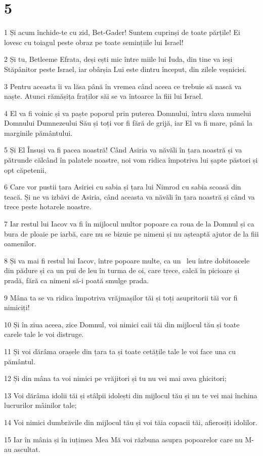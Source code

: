 \chapter{5}

\par 1 Și acum închide-te cu zid, Bet-Gader! Suntem cuprinși de toate părțile! Ei lovesc cu toiagul peste obraz pe toate semințiile lui Israel!
\par 2 Și tu, Betleeme Efrata, deși ești mic între miile lui Iuda, din tine va ieși Stăpânitor peste Israel, iar obârșia Lui este dintru început, din zilele veșniciei.
\par 3 Pentru aceasta îi va lăsa până în vremea când aceea ce trebuie să nască va naște. Atunci rămășița fraților săi se va întoarce la fiii lui Israel.
\par 4 El va fi voinic și va paște poporul prin puterea Domnului, întru slava numelui Domnului Dumnezeului Său și toți vor fi fără de grijă, iar El va fi mare, până la marginile pământului.
\par 5 Și El Însuși va fi pacea noastră! Când Asiria va năvăli în țara noastră și va pătrunde călcând în palatele noastre, noi vom ridica împotriva lui șapte păstori și opt căpetenii,
\par 6 Care vor pustii țara Asiriei cu sabia și țara lui Nimrod cu sabia scoasă din teacă. Și ne va izbăvi de Asiria, când aceasta va năvăli în țara noastră și când va trece peste hotarele noastre.
\par 7 Iar restul lui Iacov va fi în mijlocul multor popoare ca roua de la Domnul și ca bura de ploaie pe iarbă, care nu se bizuie pe nimeni și nu așteaptă ajutor de la fiii oamenilor.
\par 8 Și va mai fi restul lui Iacov, între popoare multe, ca un  leu între dobitoacele din pădure și ca un pui de leu în turma de oi, care trece, calcă în picioare și pradă, fără ca nimeni să-i poată smulge prada.
\par 9 Mâna ta se va ridica împotriva vrăjmașilor tăi și toți asupritorii tăi vor fi nimiciți!
\par 10 Și în ziua aceea, zice Domnul, voi nimici caii tăi din mijlocul tău și toate carele tale le voi distruge.
\par 11 Și voi dărâma orașele din țara ta și toate cetățile tale le voi face una cu pământul.
\par 12 Și din mâna ta voi nimici pe vrăjitori și tu nu vei mai avea ghicitori;
\par 13 Voi dărâma idolii tăi și stâlpii idolești din mijlocul tău și nu te vei mai închina lucrurilor mâinilor tale;
\par 14 Voi nimici dumbrăvile din mijlocul tău și voi tăia copacii tăi, afierosiți idolilor.
\par 15 Iar în mânia și în iuțimea Mea Mă voi răzbuna asupra popoarelor care nu M-au ascultat.

